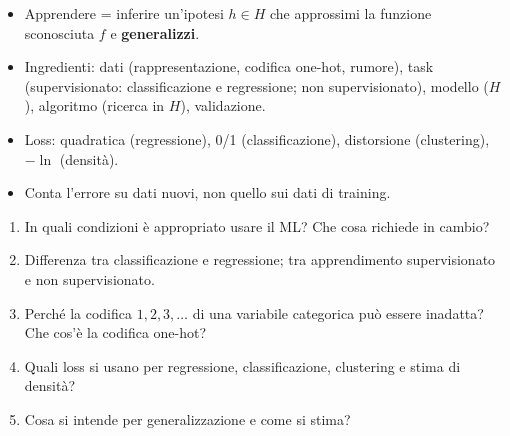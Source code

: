\begin{puntichiave}
\begin{itemize}
  \item Apprendere = inferire un'ipotesi $h\in H$ che approssimi la funzione sconosciuta $f$ e
        \textbf{generalizzi}.
  \item Ingredienti: dati (rappresentazione, codifica one-hot, rumore), task (supervisionato: classificazione e
        regressione; non supervisionato), modello ($H$), algoritmo (ricerca in $H$), validazione.
  \item Loss: quadratica (regressione), 0/1 (classificazione), distorsione (clustering), $-\ln$ (densità).
  \item Conta l'errore su dati nuovi, non quello sui dati di training.
\end{itemize}
\end{puntichiave}

\begin{domande}
\begin{enumerate}
  \item In quali condizioni è appropriato usare il ML? Che cosa richiede in cambio?
  \item Differenza tra classificazione e regressione; tra apprendimento supervisionato e non supervisionato.
  \item Perché la codifica $1,2,3,\dots$ di una variabile categorica può essere inadatta? Che cos'è la codifica
        one-hot?
  \item Quali loss si usano per regressione, classificazione, clustering e stima di densità?
  \item Cosa si intende per generalizzazione e come si stima?
\end{enumerate}
\end{domande}
